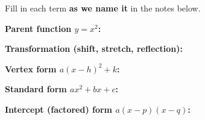 \usepackage{algebra2-boxes}
\newcommand{\vrowheight}{2.0cm}
\newcommand{\vterm}[1]{%
  \par\noindent\begin{minipage}[t][\vrowheight][t]{\linewidth}%
    \vspace*{5pt}\textbf{\textcolor{forest}{#1:}}%
  \end{minipage}\par}
\newcommand{\qgrid}[4]{%
  \draw[step=1, linegray!40, very thin] (#1,#3) grid (#2,#4);
  \draw[->, semithick, charcoal] (#1,0)--(#2,0) node[below right, font=\scriptsize]{$x$};
  \draw[->, semithick, charcoal] (0,#3)--(0,#4) node[left, font=\scriptsize]{$y$};}
\newcommand{\fdot}[3]{\fill[#1] (#2,#3) circle (3.2pt);}
\newcommand{\hdot}[3]{\draw[very thick, #1, fill=white] (#2,#3) circle (3.2pt);}




\vspace{6pt}

\begin{vocabbox}
\small
Fill in each term \textbf{as we name it} in the notes below.
\vterm{Parent function $y=x^2$}
\vterm{Transformation (shift, stretch, reflection)}
\vterm{Vertex form $a(x-h)^2+k$}
\vterm{Standard form $ax^2+bx+c$}
\vterm{Intercept (factored) form $a(x-p)(x-q)$}
\end{vocabbox}

\vspace{8pt}

